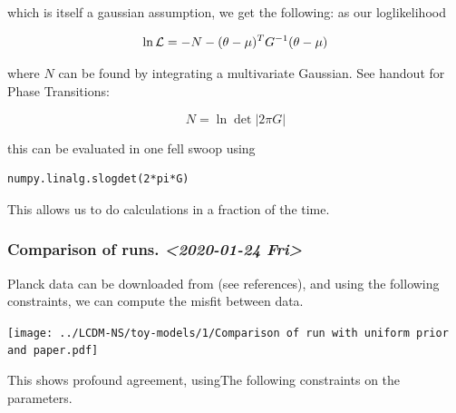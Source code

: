\documentclass[11pt]{article}
\begin{document}
which is itself a gaussian assumption, we get the following: as our loglikelihood

\begin{equation}
  \ln {\cal {L}}  = - N - (\theta - \mu)^{T}G^{-1}(\theta-\mu)
\end{equation}

where \(N\) can be found by integrating a multivariate Gaussian. See handout for Phase Transitions: 

\begin{equation}
  N = \ln \det |2\pi G |
\end{equation}

this can be evaluated in one fell swoop using 

\begin{verbatim}
numpy.linalg.slogdet(2*pi*G)
\end{verbatim}

This allows us to do calculations in a fraction of the time. 


\subsubsection{Comparison of runs. \textit{<2020-01-24 Fri>}}
\label{sec:org4fe5e5a}

Planck data can be downloaded from (see references), and using
the following constraints, we can compute the misfit between
data.


\begin{center}
\texttt{[image: ../LCDM-NS/toy-models/1/Comparison of run with uniform prior and paper.pdf]}
\end{center}


This shows profound agreement, usingThe following constraints
on the parameters.
\end{document}
